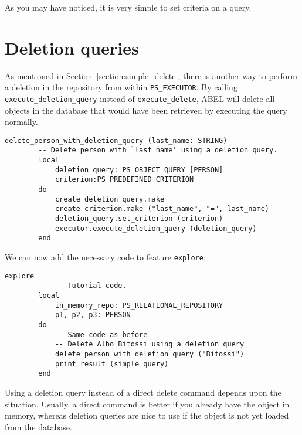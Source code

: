 \documentclass[a4paper,12pt]{report}
\begin{document}
As you may have noticed, it is very simple to set criteria on a query.

\section{Deletion queries}
\label{section:deletion_query}

As mentioned in Section~\ref{section:simple_delete}, there is another way to perform a deletion in the repository from within
\lstinline!PS_EXECUTOR!. By calling \lstinline{execute_deletion_query} instead of \lstinline{execute_delete}, ABEL will delete all objects in the database that would have been retrieved by executing the query normally.

\begin{lstlisting}[language=OOSC2Eiffel, captionpos=b, caption={Using a deletion query.}, label={lst:deletion_query}]
	delete_person_with_deletion_query (last_name: STRING)
		-- Delete person with `last_name' using a deletion query.
		local
			deletion_query: PS_OBJECT_QUERY [PERSON]
			criterion:PS_PREDEFINED_CRITERION
		do
			create deletion_query.make
			create criterion.make ("last_name", "=", last_name)
			deletion_query.set_criterion (criterion)
			executor.execute_deletion_query (deletion_query)
		end
\end{lstlisting}

We can now add the necessary code to feature \lstinline{explore}:  
\begin{lstlisting}[language=OOSC2Eiffel, captionpos=b, caption={Invoking the code that searches for Albo Bitossi}, label={lst:tutorial_print_result}]
	explore
			-- Tutorial code.
		local
			in_memory_repo: PS_RELATIONAL_REPOSITORY
			p1, p2, p3: PERSON
		do
			-- Same code as before
			-- Delete Albo Bitossi using a deletion query
			delete_person_with_deletion_query ("Bitossi")
			print_result (simple_query)
		end
\end{lstlisting}
Using a deletion query instead of a direct delete command depends upon the situation. Usually, a direct command is better if you already have the object in memory, whereas deletion queries are nice to use if the object is not yet loaded from the database.
\end{document}
